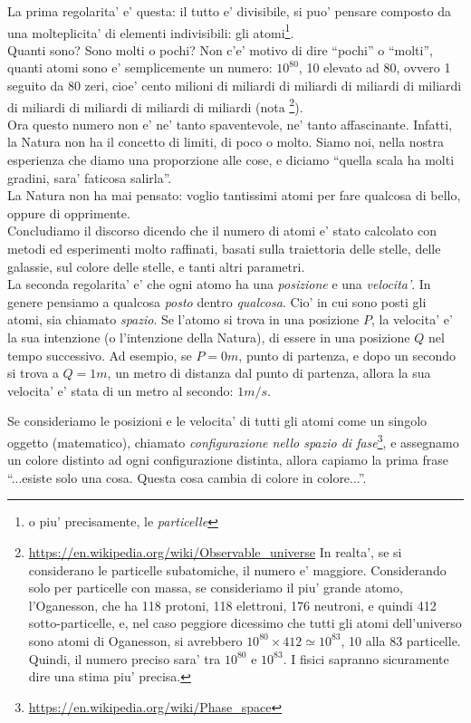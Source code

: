 La prima regolarita' e' questa: il tutto e' divisibile, si puo' pensare composto da una molteplicita' di elementi indivisibili: gli atomi\footnote{o piu' precisamente, le \emph{particelle}}.\\
Quanti sono? Sono molti o pochi? Non c'e' motivo di dire ``pochi'' o ``molti'', quanti atomi sono  e' semplicemente un numero: $10^{80}$, 10 elevato ad 80, ovvero 1 seguito da 80 zeri, cioe' cento milioni di miliardi di miliardi di miliardi di miliardi di miliardi di miliardi di miliardi di miliardi (nota \footnote{\url{https://en.wikipedia.org/wiki/Observable\_universe} In realta', se si considerano le particelle subatomiche, il numero e' maggiore. Considerando solo per particelle con massa, se consideriamo il piu' grande atomo, l'Oganesson, che ha 118 protoni, 118 elettroni, 176 neutroni, e quindi 412 sotto-particelle, e, nel caso peggiore dicessimo che tutti gli atomi dell'universo sono atomi di Oganesson, si avrebbero $10^{80}\times 412 \simeq 10^{83}$, 10 alla 83 particelle. Quindi, il numero preciso sara' tra $10^{80}$ e $10^{83}$. I fisici sapranno sicuramente dire una stima piu' precisa.}). \\
Ora questo numero non e' ne' tanto spaventevole, ne' tanto affascinante. Infatti, la Natura non ha il concetto di limiti, di poco o molto. Siamo noi, nella nostra esperienza che diamo una proporzione alle cose, e diciamo ``quella scala ha molti gradini, sara' faticosa salirla''. \\
La Natura non ha mai pensato: voglio tantissimi atomi per fare qualcosa di bello, oppure di opprimente.\\
Concludiamo il discorso dicendo che il numero di atomi e' stato calcolato con metodi ed esperimenti molto raffinati, basati sulla traiettoria delle stelle, delle galassie, sul colore delle stelle, e tanti altri parametri.\\

La seconda regolarita' e' che ogni atomo ha una \emph{posizione} e una \emph{velocita'}. In genere pensiamo a qualcosa \emph{posto} dentro \emph{qualcosa}. Cio' in cui sono posti gli atomi, sia chiamato \emph{spazio}. Se l'atomo si trova in una posizione $P$, la velocita' e' la sua intenzione (o l'intenzione della Natura), di essere in una posizione $Q$ nel tempo successivo. Ad esempio, se $P=0m$, punto di partenza, e dopo un secondo si trova a $Q=1m$, un metro di distanza dal punto di partenza, allora la sua velocita' e' stata di un metro al secondo: $1 m/s$.

Se consideriamo le posizioni e le velocita' di tutti gli atomi come un singolo oggetto (matematico), chiamato \emph{configurazione nello spazio di fase}\footnote{\url{https://en.wikipedia.org/wiki/Phase\_space}}, e assegnamo un colore distinto ad ogni configurazione distinta, allora capiamo la prima frase ``...esiste solo una cosa. Questa cosa cambia di colore in colore...''.\\


